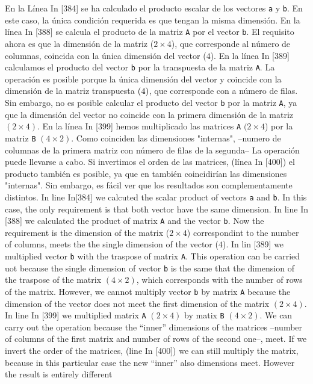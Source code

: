 \begin{paracol}{2}
En la Línea In [384] se ha calculado el producto escalar de los vectores \texttt{a} y \texttt{b}. En este caso, la única condición requerida es que tengan la misma dimensión. En la línea In [388] se calcula el producto de la matriz \texttt{A} por el vector \texttt{b}. El requisito ahora es que la dimensión de la matriz ($2\times 4$), que corresponde al número de columnas, coincida con la única dimensión del vector ($4$). En la línea In [389] calculamos el producto del vector \texttt{b} por la transpuesta de la matriz \texttt{A}. La operación es posible porque la única dimensión del vector y coincide con la dimensión  de la matriz transpuesta $(4\time2)$, que corresponde con a número de filas. Sin embargo, no es posible calcular el producto del vector \texttt{b} por la matriz \texttt{A}, ya que la dimensión del vector no coincide con la primera dimensión de la matriz $(2\times4)$. En la línea In [399] hemos multiplicado las matrices \texttt{A} $(2\times 4$) por la matriz \texttt{B} $(4\times 2)$. Como coinciden las dimensiones "internas", --numero de columnas de la primera matriz con número de filas de la segunda-- La operación puede llevarse a cabo. Si invertimos el orden de las matrices, (línea In [400]) el producto también es posible, ya que en también coincidirían las dimensiones "internas". Sin embargo, es fácil ver que los resultados son complementamente distintos.
\switchcolumn
In line In[384] we calcuted the scalar product of vectors \texttt{a} and \texttt{b}. In this case, the only requirement is that both vector have the same dimension. In line In [388] we calculated the product of matrix \texttt{A} and the vector \texttt{b}. Now the requirement is the dimension of the matrix ($2\times 4$) correspondint to the number of columns, meets the the single dimension of the vector ($4$). In lin [389] we multiplied vector \texttt{b} with the traspose of matrix \texttt{A}. This operation can be carried uot because the single dimension of vector \texttt{b} is the same that the dimension of the traspose of the matrix $(4\times 2)$, which corresponds with the number of rows of the matrix. However, we cannot multiply vector \texttt{b} by matrix \texttt{A} because the dimension of the vector does not meet the first dimension of the matrix $(2\times 4)$. In line In [399] we multiplied matrix \texttt{A} $(2\times 4)$ by matix \texttt{B} $(4\times 2)$. We can carry out the operation because the ``inner'' dimensions of the matrices --number of columns of the first matrix and number of rows of the second one--, meet. If we invert the order of the matrices, (line In [400]) we can still multiply the matrix, because in this particular case the new ``inner'' also dimensions meet. However the result is entirely different        
\end{paracol}
